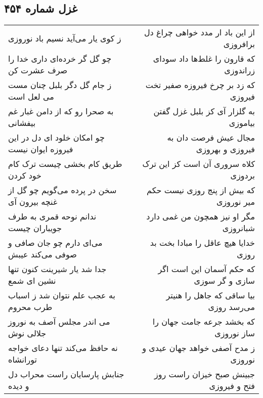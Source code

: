 \begin{center}
\section*{غزل شماره ۴۵۴}
\label{sec:sh454}
\begin{longtable}{l p{0.5cm} r}
ز کوی یار می‌آید نسیم باد نوروزی
&&
از این باد ار مدد خواهی چراغ دل برافروزی
\\
چو گل گر خرده‌ای داری خدا را صرف عشرت کن
&&
که قارون را غلط‌ها داد سودای زراندوزی
\\
ز جام گل دگر بلبل چنان مست می لعل است
&&
که زد بر چرخ فیروزه صفیر تخت فیروزی
\\
به صحرا رو که از دامن غبار غم بیفشانی
&&
به گلزار آی کز بلبل غزل گفتن بیاموزی
\\
چو امکان خلود ای دل در این فیروزه ایوان نیست
&&
مجال عیش فرصت دان به فیروزی و بهروزی
\\
طریق کام بخشی چیست ترک کام خود کردن
&&
کلاه سروری آن است کز این ترک بردوزی
\\
سخن در پرده می‌گویم چو گل از غنچه بیرون آی
&&
که بیش از پنج روزی نیست حکم میر نوروزی
\\
ندانم نوحه قمری به طرف جویباران چیست
&&
مگر او نیز همچون من غمی دارد شبانروزی
\\
می‌ای دارم چو جان صافی و صوفی می‌کند عیبش
&&
خدایا هیچ عاقل را مبادا بخت بد روزی
\\
جدا شد یار شیرینت کنون تنها نشین ای شمع
&&
که حکم آسمان این است اگر سازی و گر سوزی
\\
به عجب علم نتوان شد ز اسباب طرب محروم
&&
بیا ساقی که جاهل را هنیتر می‌رسد روزی
\\
می اندر مجلس آصف به نوروز جلالی نوش
&&
که بخشد جرعه جامت جهان را ساز نوروزی
\\
نه حافظ می‌کند تنها دعای خواجه تورانشاه
&&
ز مدح آصفی خواهد جهان عیدی و نوروزی
\\
جنابش پارسایان راست محراب دل و دیده
&&
جبینش صبح خیزان راست روز فتح و فیروزی
\\
\end{longtable}
\end{center}
